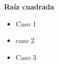 \documentclass{article}
\begin{document}
\hspace{1cm} \textbf{Raíz cuadrada}
\begin{itemize}
    \item Caso 1
     \begin{prooftree}
    \end{prooftree}
    
    \item caso 2
    \begin{prooftree}
    \end{prooftree}
    
    \item Caso 3
    \begin{prooftree}
    \end{prooftree}
\end{itemize}
\end{document}
